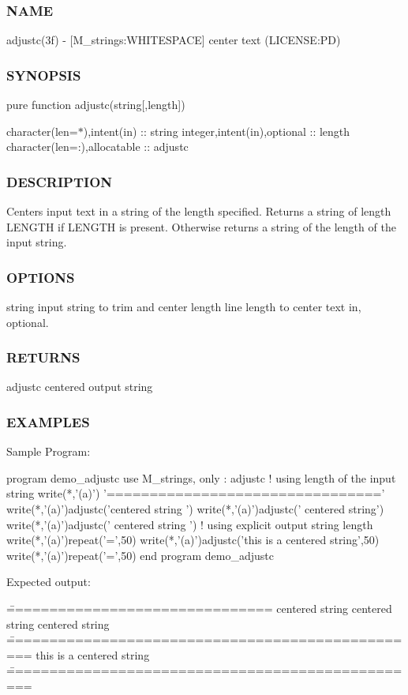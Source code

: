 \subsubsection*{N\+A\+ME}

adjustc(3f) -\/ \mbox{[}M\+\_\+strings\+:W\+H\+I\+T\+E\+S\+P\+A\+CE\mbox{]} center text (L\+I\+C\+E\+N\+SE\+:PD) 

\subsubsection*{S\+Y\+N\+O\+P\+S\+IS}

pure function adjustc(string\mbox{[},length\mbox{]})

character(len=$\ast$),intent(in) \+:\+: string integer,intent(in),optional \+:\+: length character(len=\+:),allocatable \+:\+: adjustc \subsubsection*{D\+E\+S\+C\+R\+I\+P\+T\+I\+ON}

Centers input text in a string of the length specified. Returns a string of length L\+E\+N\+G\+TH if L\+E\+N\+G\+TH is present. Otherwise returns a string of the length of the input string. \subsubsection*{O\+P\+T\+I\+O\+NS}

string input string to trim and center length line length to center text in, optional. \subsubsection*{R\+E\+T\+U\+R\+NS}

adjustc centered output string

\subsubsection*{E\+X\+A\+M\+P\+L\+ES}

\begin{DoxyVerb}Sample Program:

 program demo_adjustc
 use M_strings, only : adjustc
 !  using length of the input string
    write(*,'(a)')       '================================'
    write(*,'(a)')adjustc('centered string                 ')
    write(*,'(a)')adjustc('                 centered string')
    write(*,'(a)')adjustc('  centered string               ')
 !  using explicit output string length
    write(*,'(a)')repeat('=',50)
    write(*,'(a)')adjustc('this is a centered string',50)
    write(*,'(a)')repeat('=',50)
 end program demo_adjustc

Expected output:

 \================================
         centered string
         centered string
         centered string
 \==================================================
             this is a centered string
 \==================================================
\end{DoxyVerb}
